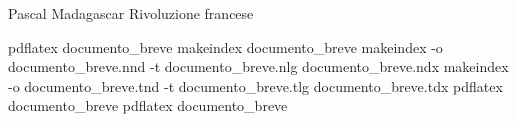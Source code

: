 
\usepackage{index}


Pascal
Madagascar
Rivoluzione francese


\printindex %
\printindex[luoghi] %


pdflatex documento_breve %
makeindex documento_breve %
makeindex -o documento_breve.nnd -t documento_breve.nlg documento_breve.ndx %
makeindex -o documento_breve.tnd -t documento_breve.tlg documento_breve.tdx %
pdflatex documento_breve %
pdflatex documento_breve
